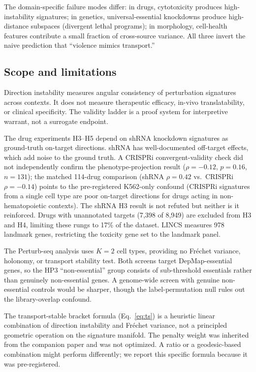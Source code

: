 \documentclass{article}
\begin{document}
The domain-specific failure modes differ: in drugs, cytotoxicity
produces high-instability signatures; in genetics, universal-essential
knockdowns produce high-distance subspaces (divergent lethal programs);
in morphology, cell-health features contribute a small fraction of
cross-source variance. All three invert the naive prediction that
``violence mimics transport.''

\subsection{Scope and limitations}

Direction instability measures angular consistency of perturbation signatures
across contexts. It does not measure therapeutic efficacy, in-vivo
translatability, or clinical specificity. The validity ladder is a proof
system for interpretive warrant, not a surrogate endpoint.

The drug experiments H3--H5 depend on shRNA knockdown signatures as
ground-truth on-target directions. shRNA has well-documented off-target
effects, which add noise to the ground truth. A CRISPRi
convergent-validity check did not
independently confirm the phenotype-projection result ($\rho = -0.12$,
$p = 0.16$, $n = 131$); the matched 114-drug comparison (shRNA
$\rho = 0.42$ vs.\ CRISPRi $\rho = -0.14$) points to the
pre-registered K562-only confound (CRISPRi signatures from a single
cell type are poor on-target directions for drugs acting in
non-hematopoietic contexts). The shRNA H3 result is not refuted but
neither is it reinforced. Drugs with unannotated targets
(7{,}398 of 8{,}949) are excluded from H3 and H4, limiting these rungs
to 17\% of the dataset. LINCS measures 978 landmark genes, restricting
the toxicity gene set to the landmark panel.

The Perturb-seq analysis uses $K = 2$ cell types, providing no Fr\'echet
variance, holonomy, or transport stability test. Both screens target
DepMap-essential genes, so the HP3 ``non-essential'' group consists of
sub-threshold essentials rather than genuinely non-essential genes. A
genome-wide screen with genuine non-essential controls would be sharper,
though the label-permutation null rules out the library-overlap confound.

The transport-stable bracket formula (Eq.~\ref{eq:ts}) is a heuristic
linear combination of direction instability and Fr\'echet variance, not a
principled geometric operation on the signature manifold. The penalty
weight was inherited from the companion paper and was not optimized.
A ratio or a geodesic-based combination might perform differently; we
report this specific formula because it was pre-registered.
\end{document}
